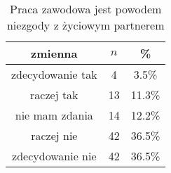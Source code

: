 \begin{table}[H]
\caption{Praca zawodowa jest powodem niezgody z życiowym partnerem}
\centering
\begin{tabular}{ | c | c | c |}
\hline
zmienna & $n$ & \% \\
\hline
zdecydowanie tak  &  4  & 3.5\% \\
\hline
raczej tak  &  13  & 11.3\% \\
\hline
nie mam zdania  &  14  & 12.2\% \\
\hline
raczej nie  &  42  & 36.5\% \\
\hline
zdecydowanie nie  &  42  & 36.5\% \\
\hline
\end{tabular}
\label{tab:Q28}
\end{table}
